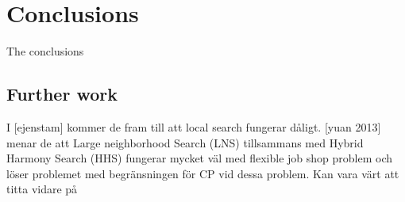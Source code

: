 \chapter{Conclusions} 
The conclusions

\section{Further work}
I [ejenstam] kommer de fram till att local search fungerar dåligt.\cite{ejenstam_2014} [yuan 2013] menar de att Large neighborhood Search (LNS) tillsammans med Hybrid Harmony Search (HHS) fungerar mycket väl med flexible job shop problem och löser problemet med begränsningen för CP vid dessa problem.\cite{yuan_2013} Kan vara värt att titta vidare på